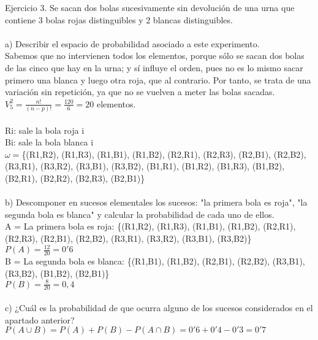 \problem
Ejercicio 3. Se sacan dos bolas sucesivamente sin devolución de una urna que contiene 3 bolas rojas distinguibles y 2 blancas distinguibles. \\ \\
a) Describir el espacio de probabilidad asociado a este experimento. \\
Sabemos que no intervienen todos los elementos, porque sólo se sacan dos bolas de las cinco que hay en la urna; y sí influye el orden, pues no es lo mismo sacar primero una blanca y luego otra roja, que al contrario. Por tanto, se trata de una variación sin repetición, ya que no se vuelven a meter las bolas sacadas. \\
$V^{2}_{5} = \frac{n!}{(n-p)!}= \frac{120}{6} = 20$ elementos. \\ \\
Ri: sale la bola roja i \\
Bi: sale la bola blanca i \\
$\omega = $\{(R1,R2), (R1,R3), (R1,B1), (R1,B2), (R2,R1), (R2,R3), (R2,B1), (R2,B2), (R3,R1), (R3,R2), (R3,B1), (R3,B2), (B1,R1), (B1,R2), (B1,R3), (B1,B2), (B2,R1), (B2,R2), (B2,R3), (B2,B1)\} \\ \\
b) Descomponer en sucesos elementales los sucesos: "la primera bola es roja", "la segunda bola es blanca" y calcular la probabilidad de cada uno de ellos. \\
A = La primera bola es roja: \{(R1,R2), (R1,R3), (R1,B1), (R1,B2), (R2,R1), (R2,R3), (R2,B1), (R2,B2), (R3,R1), (R3,R2), (R3,B1), (R3,B2)\} \\
$P(A) = \frac{12}{20} = 0'6$ \\
B = La segunda bola es blanca: \{(R1,B1), (R1,B2), (R2,B1), (R2,B2), (R3,B1), (R3,B2), (B1,B2), (B2,B1)\} \\
$P(B) = \frac{8}{20} = 0,4$ \\ \\
c) ¿Cuál es la probabilidad de que ocurra alguno de los sucesos considerados en el apartado anterior? \\
$P(A\cup B) = P(A)+P(B)-P(A\cap B) = 0'6 + 0'4 - 0'3 = 0'7$ \\ \\
